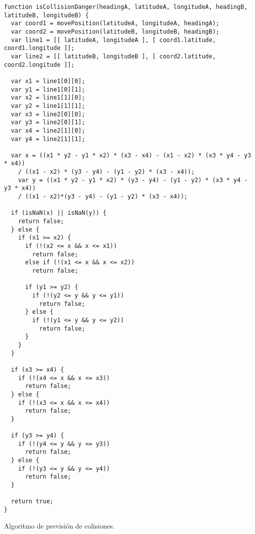 \begin{listing}
	\begin{minipage}{.4\textwidth}
		\begin{verbatim}
function isCollisionDanger(headingA, latitudeA, longitudeA, headingB, latitudeB, longitudeB) {
  var coord1 = movePosition(latitudeA, longitudeA, headingA);
  var coord2 = movePosition(latitudeB, longitudeB, headingB);
  var line1 = [[ latitudeA, longitudeA ], [ coord1.latitude, coord1.longitude ]];
  var line2 = [[ latitudeB, longitudeB ], [ coord2.latitude, coord2.longitude ]];

  var x1 = line1[0][0];
  var y1 = line1[0][1];
  var x2 = line1[1][0];
  var y2 = line1[1][1];
  var x3 = line2[0][0];
  var y3 = line2[0][1];
  var x4 = line2[1][0];
  var y4 = line2[1][1];
	
  var x = ((x1 * y2 - y1 * x2) * (x3 - x4) - (x1 - x2) * (x3 * y4 - y3 * x4))
    / ((x1 - x2) * (y3 - y4) - (y1 - y2) * (x3 - x4));
	var y = ((x1 * y2 - y1 * x2) * (y3 - y4) - (y1 - y2) * (x3 * y4 - y3 * x4))
	/ ((x1 - x2)*(y3 - y4) - (y1 - y2) * (x3 - x4));
	
  if (isNaN(x) || isNaN(y)) {
    return false;
  } else {
    if (x1 >= x2) {
      if (!(x2 <= x && x <= x1))
        return false; 
      else if (!(x1 <= x && x <= x2))
        return false; 

      if (y1 >= y2) {
        if (!(y2 <= y && y <= y1))
          return false;
      } else {
        if (!(y1 <= y && y <= y2))
          return false;
      }
    }
  }

  if (x3 >= x4) {
	if (!(x4 <= x && x <= x3)) 
	  return false;
  } else {
    if (!(x3 <= x && x <= x4)) 
      return false;
  }

  if (y3 >= y4) {
    if (!(y4 <= y && y <= y3))
      return false;
  } else {
    if (!(y3 <= y && y <= y4)) 
      return false;
  }

  return true;	
}
	\end{verbatim}
\end{minipage}
\caption{Algoritmo de previsión de colisiones.}\label{alg:deteccion_colisiones}
\end{listing}
